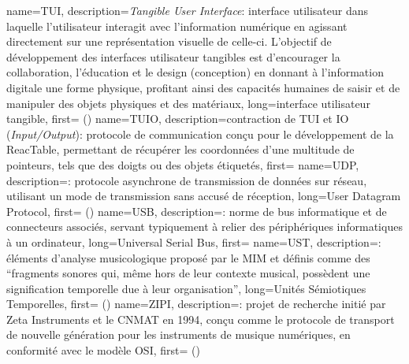 {
    name={TUI},
    description={\textit{Tangible User Interface}: interface utilisateur dans laquelle l'utilisateur interagit avec l'information numérique en agissant directement sur une représentation visuelle de celle-ci. L'objectif de développement des interfaces utilisateur tangibles est d'encourager la collaboration, l'éducation et le design (conception) en donnant à l'information digitale une forme physique, profitant ainsi des capacités humaines de saisir et de manipuler des objets physiques et des matériaux},
    long={interface utilisateur tangible},
    first={} ()
}
{
    name={TUIO},
    description={contraction de \gls{TUI} et IO (\textit{Input/Output}): protocole de communication conçu pour le développement de la ReacTable, permettant de récupérer les coordonnées d'une multitude de pointeurs, tels que des doigts ou des objets étiquetés},
    first={}
}
{
    name={UDP},
    description={\textit{}: protocole asynchrone de transmission de données sur réseau, utilisant un mode de transmission sans accusé de réception},
    long={User Datagram Protocol},
    first={ ()}
}
{
    name={USB},
    description={\textit{}: norme de bus informatique et de connecteurs associés, servant typiquement à relier des périphériques informatiques à un ordinateur},
    long={Universal Serial Bus},
    first={}
}
{
    name={UST},
    description={\textit{}: éléments d'analyse musicologique proposé par le \gls{MIM} et définis comme des ``fragments sonores qui, même hors de leur contexte musical, possèdent une signification temporelle due à leur organisation''},
    long={Unités Sémiotiques Temporelles},
    first={ ()}
}
{
    name={ZIPI},
    description={\textit{}: projet de recherche initié par Zeta Instruments et le \gls{CNMAT} en 1994, conçu comme le protocole de transport de nouvelle génération pour les instruments de musique numériques, en conformité avec le modèle \gls{OSI}},
    first={ ()}
}


%
